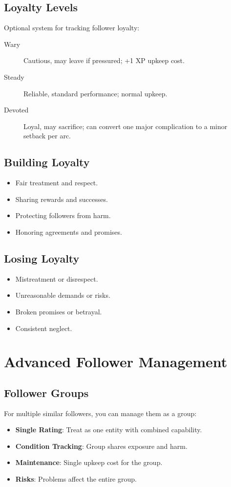 \subsection*{Loyalty Levels}
Optional system for tracking follower loyalty:
\begin{description}
\item[Wary] Cautious, may leave if pressured; +1 XP upkeep cost.
\item[Steady] Reliable, standard performance; normal upkeep.
\item[Devoted] Loyal, may sacrifice; can convert one major complication to a minor setback per arc.
\end{description}

\subsection*{Building Loyalty}
\begin{itemize}
\item Fair treatment and respect.
\item Sharing rewards and successes.
\item Protecting followers from harm.
\item Honoring agreements and promises.
\end{itemize}

\subsection*{Losing Loyalty}
\begin{itemize}
\item Mistreatment or disrespect.
\item Unreasonable demands or risks.
\item Broken promises or betrayal.
\item Consistent neglect.
\end{itemize}

\section{Advanced Follower Management}

\subsection*{Follower Groups}
For multiple similar followers, you can manage them as a group:
\begin{itemize}
\item \textbf{Single Rating}: Treat as one entity with combined capability.
\item \textbf{Condition Tracking}: Group shares exposure and harm.
\item \textbf{Maintenance}: Single upkeep cost for the group.
\item \textbf{Risks}: Problems affect the entire group.
\end{itemize}

